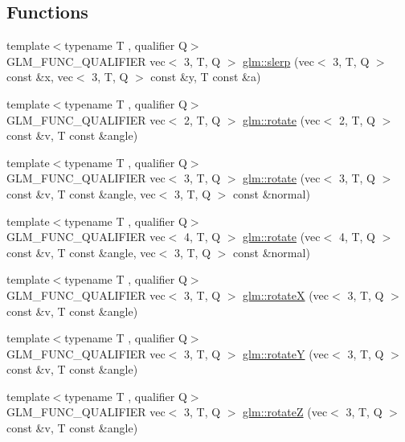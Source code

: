 \subsection*{Functions}
\begin{DoxyCompactItemize}
\item 
{\footnotesize template$<$typename T , qualifier Q$>$ }\\G\+L\+M\+\_\+\+F\+U\+N\+C\+\_\+\+Q\+U\+A\+L\+I\+F\+I\+ER vec$<$ 3, T, Q $>$ \hyperlink{group__gtx__rotate__vector_ga8b11b18ce824174ea1a5a69ea14e2cee}{glm\+::slerp} (vec$<$ 3, T, Q $>$ const \&x, vec$<$ 3, T, Q $>$ const \&y, T const \&a)
\item 
{\footnotesize template$<$typename T , qualifier Q$>$ }\\G\+L\+M\+\_\+\+F\+U\+N\+C\+\_\+\+Q\+U\+A\+L\+I\+F\+I\+ER vec$<$ 2, T, Q $>$ \hyperlink{group__gtx__rotate__vector_gab64a67b52ff4f86c3ba16595a5a25af6}{glm\+::rotate} (vec$<$ 2, T, Q $>$ const \&v, T const \&angle)
\item 
{\footnotesize template$<$typename T , qualifier Q$>$ }\\G\+L\+M\+\_\+\+F\+U\+N\+C\+\_\+\+Q\+U\+A\+L\+I\+F\+I\+ER vec$<$ 3, T, Q $>$ \hyperlink{group__gtx__rotate__vector_ga1ba501ef83d1a009a17ac774cc560f21}{glm\+::rotate} (vec$<$ 3, T, Q $>$ const \&v, T const \&angle, vec$<$ 3, T, Q $>$ const \&normal)
\item 
{\footnotesize template$<$typename T , qualifier Q$>$ }\\G\+L\+M\+\_\+\+F\+U\+N\+C\+\_\+\+Q\+U\+A\+L\+I\+F\+I\+ER vec$<$ 4, T, Q $>$ \hyperlink{group__gtx__rotate__vector_ga1005f1267ed9c57faa3f24cf6873b961}{glm\+::rotate} (vec$<$ 4, T, Q $>$ const \&v, T const \&angle, vec$<$ 3, T, Q $>$ const \&normal)
\item 
{\footnotesize template$<$typename T , qualifier Q$>$ }\\G\+L\+M\+\_\+\+F\+U\+N\+C\+\_\+\+Q\+U\+A\+L\+I\+F\+I\+ER vec$<$ 3, T, Q $>$ \hyperlink{group__gtx__rotate__vector_ga059fdbdba4cca35cdff172a9d0d0afc9}{glm\+::rotateX} (vec$<$ 3, T, Q $>$ const \&v, T const \&angle)
\item 
{\footnotesize template$<$typename T , qualifier Q$>$ }\\G\+L\+M\+\_\+\+F\+U\+N\+C\+\_\+\+Q\+U\+A\+L\+I\+F\+I\+ER vec$<$ 3, T, Q $>$ \hyperlink{group__gtx__rotate__vector_gaebdc8b054ace27d9f62e054531c6f44d}{glm\+::rotateY} (vec$<$ 3, T, Q $>$ const \&v, T const \&angle)
\item 
{\footnotesize template$<$typename T , qualifier Q$>$ }\\G\+L\+M\+\_\+\+F\+U\+N\+C\+\_\+\+Q\+U\+A\+L\+I\+F\+I\+ER vec$<$ 3, T, Q $>$ \hyperlink{group__gtx__rotate__vector_ga5a048838a03f6249acbacb4dbacf79c4}{glm\+::rotateZ} (vec$<$ 3, T, Q $>$ const \&v, T const \&angle)

\end{DoxyCompactItemize}
